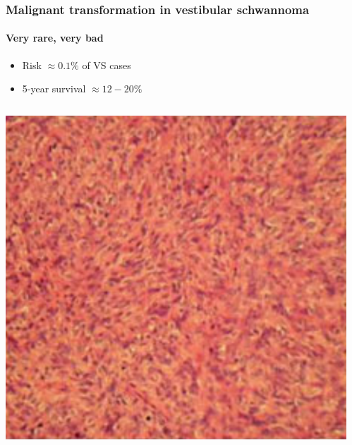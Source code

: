 \documentclass{beamer}
\begin{document}
\begin{frame}
    \frametitle{Malignant transformation in vestibular schwannoma}
    \framesubtitle{Very rare, very bad}
            \begin{itemize}
                \item Risk $\approx 0.1\%$ of VS cases
                \item 5-year survival $\approx 12-20\%$
            \end{itemize}
    \begin{columns}
        \begin{column}{0.5\textwidth}
        \includegraphics[width=\textwidth]{figures/AKDemetriades_Fig5C.png}
        \end{column}
        \begin{column}{0.5\textwidth}

\end{column}
\end{columns}
\end{frame}
\end{document}
